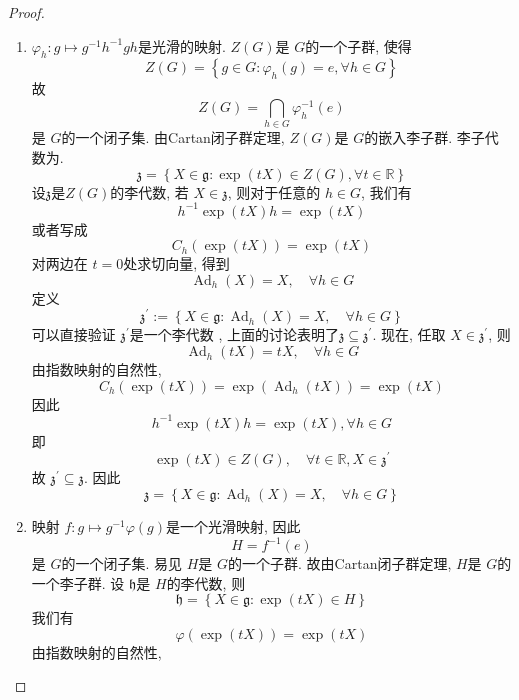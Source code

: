 \documentclass[../main.tex]{subfiles}
\begin{document}
\begin{proof}
  \begin{enumerate}
    \item \( \varphi _{h}:  g\mapsto  g^{-1} h^{-1} gh  \)是光滑的映射. \(  Z\left( G \right)   \)是 \(  G  \)的一个子群, 使得 \[
   Z\left( G \right)= \left\{ g\in G: \varphi _{h}\left( g \right) = e,\forall h\in G  \right\} 
   \] 故 \[
  Z\left( G \right)=  \bigcap _{h\in G} \varphi _{h}^{-1}  \left( e\right) 
  \]  是 \(  G  \)的一个闭子集. 由Cartan闭子群定理,  \(  Z\left( G \right)   \)是 \(  G  \)的嵌入李子群.   
  李子代数为.
  \[
  \mathfrak{z}= \left\{ X \in \mathfrak{g}:  \exp \left( tX \right)\in Z\left( G \right) ,\forall t\in \mathbb{R}   \right\}
  \] 设\(  \mathfrak{z}  \)是\(  Z\left( G \right)   \)的李代数,   若 \(  X \in \mathfrak{z}  \), 则对于任意的 \(  h\in G  \),  我们有 \[
  h^{-1} \exp \left( tX \right)h= \exp \left( tX \right)  
  \] 或者写成\[
  C_{h}\left( \exp \left( tX \right)  \right)= \exp \left( tX \right)  
  \]对两边在 \(  t= 0  \)处求切向量, 得到  \[
  \operatorname{Ad}_{h}\left( X \right)= X ,\quad \forall h\in G
  \]定义 \[
  \mathfrak{z}^{\prime} := \left\{ X \in \mathfrak{g}: \operatorname{Ad}_{h}\left( X \right)= X,\quad \forall h\in G  \right\}
  \]可以直接验证 \(  \mathfrak{z}^{\prime}   \)是一个李代数 , 上面的讨论表明了\(  \mathfrak{z}\subseteq \mathfrak{z}^{\prime}   \). 现在, 任取 \(  X \in \mathfrak{z}^{\prime}   \), 则 \[
  \operatorname{Ad}_{h}\left(t X \right)=t X,\quad \forall h\in G 
  \]   由指数映射的自然性,  \[
 C_{h}\left( \exp \left( tX \right)  \right)= \exp \left( \operatorname{Ad}_{h}\left( tX \right)  \right)= \exp \left( tX \right)   
  \]因此 \[
  h^{-1} \exp \left( tX \right)h= \exp \left( tX \right),\forall h\in G  
  \]即 \[
  \exp \left( tX \right)\in Z\left( G \right),\quad \forall t\in \mathbb{R} ,X \in \mathfrak{z}^{\prime}   
  \]故 \(  \mathfrak{z}^{\prime} \subseteq \mathfrak{z}  \). 因此 \[
  \mathfrak{z}= \left\{ X \in \mathfrak{g}: \operatorname{Ad}_{h}\left( X \right)= X,\quad \forall h\in G  \right\}
  \]  
  \item 映射 \( f: g\mapsto g^{-1}  \varphi \left( g \right)   \)是一个光滑映射, 因此 \[
  H= f^{-1} \left( e \right) 
  \] 是 \(  G  \)的一个闭子集. 易见 \(  H  \)是 \(  G  \)的一个子群. 故由Cartan闭子群定理,  \(  H  \)是 \(  G  \)的一个李子群. 设 \(  \mathfrak{h}  \)是 \(  H  \)的李代数, 则 \[
  \mathfrak{h}= \left\{ X \in \mathfrak{g}: \exp \left( tX \right)\in H  \right\}
  \]       我们有 \[
   \varphi \left( \exp \left( tX \right)  \right)= \exp \left( tX \right)  
  \]由指数映射的自然性,  \[
\]
\end{enumerate}
\end{proof}
\end{document}
